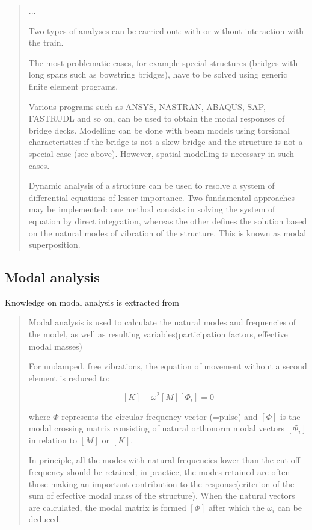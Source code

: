 \begin{appendices}
\begin{quote}
...

Two types of analyses can be carried out: with or without interaction with the train.

The most problematic cases, for example special structures (bridges with long spans such as bowstring bridges), have to be solved using generic finite element programs.

Various programs such as ANSYS, NASTRAN, ABAQUS, SAP, FASTRUDL and so on, can be used to obtain the modal responses of bridge decks. Modelling can be done with beam models using torsional characteristics if the bridge is not a skew bridge and the structure is not a special case (see above). However, spatial modelling is necessary in such cases.

Dynamic analysis of a structure can be used to resolve a system of differential equations of lesser importance. Two fundamental approaches may be implemented: one method consists in solving the system of equation by direct integration, whereas the other defines the solution based on the natural modes of vibration of the structure. This is known as modal superposition. 
\end{quote}

\subsection{Modal analysis}

Knowledge on modal analysis is extracted from \citet{UIC776-2}

\begin{quote}

Modal analysis is used to calculate the natural modes and frequencies of the model, as well as resulting variables(participation factors, effective modal masses)

For undamped, free vibrations, the equation of movement without a second element is reduced to:

$$  [K] - \omega^2[M][\Phi_i] = 0 $$

where $\Phi$ represents the circular frequency vector (=pulse) and $[\Phi]$ is the modal crossing matrix consisting of natural orthonorm modal vectors $[\Phi_i]$ in relation to $[M]$ or $[K]$.

In principle, all the modes with natural frequencies lower than the cut-off frequency should be retained; in practice, the modes retained are often those making an important contribution to the response(criterion of the sum of effective modal mass of the structure). When the natural vectors are calculated, the modal matrix is formed $[\Phi]$ after which the $\omega_i$ can be deduced.


\end{quote}
\end{appendices}
